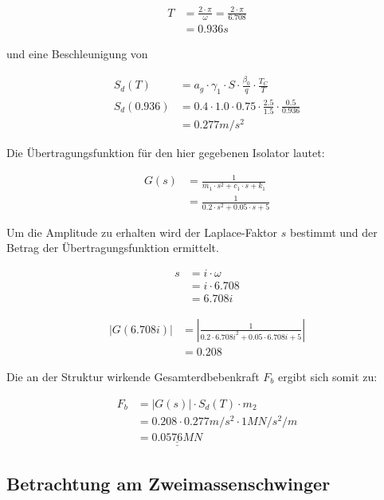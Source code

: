 \begin{align*}
T &= \frac{2 \cdot \pi}{\omega} = \frac{2 \cdot \pi}{6.708}\\
  &= 0.936 s
\end{align*}

und eine Beschleunigung von

\begin{align*}
S_d(T) &= a_g \cdot \gamma_1 \cdot S \cdot \frac{\beta_0}{q} \cdot \frac{T_C}{T}\\
S_d(0.936) &= 0.4 \cdot 1.0 \cdot 0.75 \cdot \frac{2.5}{1.5} \cdot \frac{0.5}{0.936}\\
           &= 0.277 m/s^2
\end{align*}

Die Übertragungsfunktion für den hier gegebenen Isolator lautet:

\begin{align*}
G(s) &= \frac{1}{m_1 \cdot s^2 + c_1 \cdot s + k_1}\\
     &= \frac{1}{0.2 \cdot s^2 + 0.05 \cdot s + 5}
\end{align*}

Um die Amplitude zu erhalten wird der Laplace-Faktor $s$ bestimmt und der Betrag der Übertragungsfunktion ermittelt.

\begin{align*}
s &= i \cdot \omega\\
  &= i \cdot 6.708\\
  &= 6.708i
\end{align*}

\begin{align*}
|G(6.708i)| &= |\frac{1}{0.2 \cdot 6.708i^2 + 0.05 \cdot 6.708i + 5}|\\
            &= 0.208
\end{align*}

Die an der Struktur wirkende Gesamterdbebenkraft $F_b$ ergibt sich somit zu:

\begin{align*}
F_b &= |G(s)| \cdot S_d(T) \cdot m_2\\
    &= 0.208 \cdot 0.277 m/s^2 \cdot 1 MN/s^2/m\\
    &= \underline{\underline{0.0576 MN}}
\end{align*}

\subsection{Betrachtung am Zweimassenschwinger}

